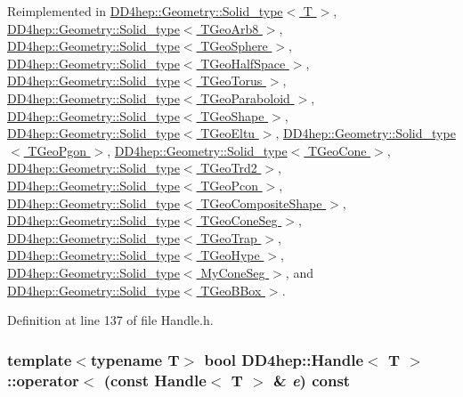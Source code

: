 Reimplemented in \hyperlink{class_d_d4hep_1_1_geometry_1_1_solid__type_a5d2e4f5e2567ddb3c60bf78a25f5e0b4}{DD4hep::Geometry::Solid\_\-type$<$ T $>$}, \hyperlink{class_d_d4hep_1_1_geometry_1_1_solid__type_a5d2e4f5e2567ddb3c60bf78a25f5e0b4}{DD4hep::Geometry::Solid\_\-type$<$ TGeoArb8 $>$}, \hyperlink{class_d_d4hep_1_1_geometry_1_1_solid__type_a5d2e4f5e2567ddb3c60bf78a25f5e0b4}{DD4hep::Geometry::Solid\_\-type$<$ TGeoSphere $>$}, \hyperlink{class_d_d4hep_1_1_geometry_1_1_solid__type_a5d2e4f5e2567ddb3c60bf78a25f5e0b4}{DD4hep::Geometry::Solid\_\-type$<$ TGeoHalfSpace $>$}, \hyperlink{class_d_d4hep_1_1_geometry_1_1_solid__type_a5d2e4f5e2567ddb3c60bf78a25f5e0b4}{DD4hep::Geometry::Solid\_\-type$<$ TGeoTorus $>$}, \hyperlink{class_d_d4hep_1_1_geometry_1_1_solid__type_a5d2e4f5e2567ddb3c60bf78a25f5e0b4}{DD4hep::Geometry::Solid\_\-type$<$ TGeoParaboloid $>$}, \hyperlink{class_d_d4hep_1_1_geometry_1_1_solid__type_a5d2e4f5e2567ddb3c60bf78a25f5e0b4}{DD4hep::Geometry::Solid\_\-type$<$ TGeoShape $>$}, \hyperlink{class_d_d4hep_1_1_geometry_1_1_solid__type_a5d2e4f5e2567ddb3c60bf78a25f5e0b4}{DD4hep::Geometry::Solid\_\-type$<$ TGeoEltu $>$}, \hyperlink{class_d_d4hep_1_1_geometry_1_1_solid__type_a5d2e4f5e2567ddb3c60bf78a25f5e0b4}{DD4hep::Geometry::Solid\_\-type$<$ TGeoPgon $>$}, \hyperlink{class_d_d4hep_1_1_geometry_1_1_solid__type_a5d2e4f5e2567ddb3c60bf78a25f5e0b4}{DD4hep::Geometry::Solid\_\-type$<$ TGeoCone $>$}, \hyperlink{class_d_d4hep_1_1_geometry_1_1_solid__type_a5d2e4f5e2567ddb3c60bf78a25f5e0b4}{DD4hep::Geometry::Solid\_\-type$<$ TGeoTrd2 $>$}, \hyperlink{class_d_d4hep_1_1_geometry_1_1_solid__type_a5d2e4f5e2567ddb3c60bf78a25f5e0b4}{DD4hep::Geometry::Solid\_\-type$<$ TGeoPcon $>$}, \hyperlink{class_d_d4hep_1_1_geometry_1_1_solid__type_a5d2e4f5e2567ddb3c60bf78a25f5e0b4}{DD4hep::Geometry::Solid\_\-type$<$ TGeoCompositeShape $>$}, \hyperlink{class_d_d4hep_1_1_geometry_1_1_solid__type_a5d2e4f5e2567ddb3c60bf78a25f5e0b4}{DD4hep::Geometry::Solid\_\-type$<$ TGeoConeSeg $>$}, \hyperlink{class_d_d4hep_1_1_geometry_1_1_solid__type_a5d2e4f5e2567ddb3c60bf78a25f5e0b4}{DD4hep::Geometry::Solid\_\-type$<$ TGeoTrap $>$}, \hyperlink{class_d_d4hep_1_1_geometry_1_1_solid__type_a5d2e4f5e2567ddb3c60bf78a25f5e0b4}{DD4hep::Geometry::Solid\_\-type$<$ TGeoHype $>$}, \hyperlink{class_d_d4hep_1_1_geometry_1_1_solid__type_a5d2e4f5e2567ddb3c60bf78a25f5e0b4}{DD4hep::Geometry::Solid\_\-type$<$ MyConeSeg $>$}, and \hyperlink{class_d_d4hep_1_1_geometry_1_1_solid__type_a5d2e4f5e2567ddb3c60bf78a25f5e0b4}{DD4hep::Geometry::Solid\_\-type$<$ TGeoBBox $>$}.

Definition at line 137 of file Handle.h.\hypertarget{class_d_d4hep_1_1_handle_a287ad7d458faab8f84dbfa6fd48e1d30}{
\subsubsection[{operator$<$}]{\setlength{\rightskip}{0pt plus 5cm}template$<$typename T$>$ bool {\bf DD4hep::Handle}$<$ {\bf T} $>$::operator$<$ (const {\bf Handle}$<$ {\bf T} $>$ \& {\em e}) const}}
\label{class_d_d4hep_1_1_handle_a287ad7d458faab8f84dbfa6fd48e1d30}


